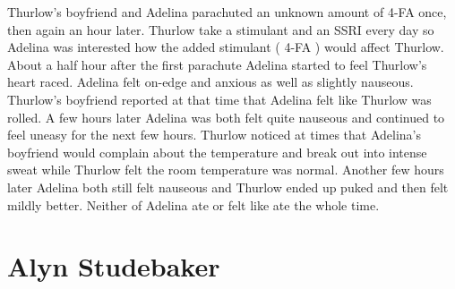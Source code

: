 \documentclass[12pt]{book}
\begin{document}
Thurlow's boyfriend and Adelina parachuted an unknown amount of 4-FA once, then again an hour later. Thurlow take a stimulant and an SSRI every day so Adelina was interested how the added stimulant ( 4-FA ) would affect Thurlow. About a half hour after the first parachute Adelina started to feel Thurlow's heart raced. Adelina felt on-edge and anxious as well as slightly nauseous. Thurlow's boyfriend reported at that time that Adelina felt like Thurlow was rolled. A few hours later Adelina was both felt quite nauseous and continued to feel uneasy for the next few hours. Thurlow noticed at times that Adelina's boyfriend would complain about the temperature and break out into intense sweat while Thurlow felt the room temperature was normal. Another few hours later Adelina both still felt nauseous and Thurlow ended up puked and then felt mildly better. Neither of Adelina ate or felt like ate the whole time.



\chapter{Alyn Studebaker}
\end{document}
